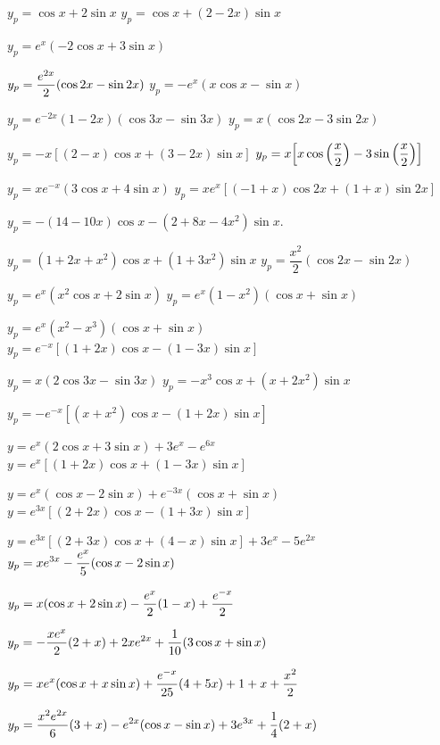 
 $y_p=\cos x+2\sin x$
 $y_p=\cos x+(2-2x)\sin x$

 $y_p=e^x(-2\cos x+3\sin x)$

 $y_p=\displaystyle{\frac{e^{2x}}{2}(\cos2x-\sin2x)}$
 $y_p=-e^x(x\cos x-\sin x)$

 $y_p=e^{-2x}(1-2x)(\cos 3x-\sin 3x)$
 $y_p=x(\cos2x-3\sin2x)$

 $y_p=-x\left[(2-x)\cos x+(3-2x)\sin x\right]$
 $y_p=x\displaystyle{\left[x\cos\left(\frac{x}{2}\right)
-3\sin\left(\frac{x}{2}\right)\right]}$

 $y_p=xe^{-x}(3\cos x+4\sin x)$
 $y_p=xe^x\left[(-1+x)\cos2x+(1+x)\sin
2x\right]$

$y_p=-(14-10x)\cos x-(2+8x-4x^2)\sin x$.

 $y_p=(1+2x+x^2)\cos x+(1+3x^2)\sin x$
 $y_p=\dfrac{x^2}{2}(\cos2x-\sin2x)$

 $y_p=e^x(x^2\cos x+2\sin x)$
 $y_p=e^x(1-x^2)(\cos x+\sin x)$

 $y_p=e^x(x^2-x^3)(\cos x+\sin x)$
 $y_p=e^{-x}\left[(1+2x)\cos x-(1-3x)\sin
x\right]$

 $y_p=x(2\cos 3x-\sin 3x)$
 $y_p=-x^3\cos x+(x+2x^2)\sin x$

$y_p=-e^{-x}\left[(x+x^2)\cos x-(1+2x)\sin x\right]$

$y=e^x(2\cos x+3\sin x)+3e^x-e^{6x}$
$y=e^x\left[(1+2x)\cos x+(1-3x)\sin x\right]$

  $y=e^x(\cos x-2\sin x)+e^{-3x}(\cos x+\sin x)$
$y=e^{3x}\left[(2+2x)\cos x-(1+3x)\sin x\right]$

$y=e^{3x}\left[(2+3x)\cos x+(4-x)\sin x\right]+3e^x-5e^{2x}$
 $y_p=\displaystyle{xe^{3x}-\frac{e^x}{5}(\cos x-2\sin
x)}$

 $y_p=\displaystyle{x(\cos x+2\sin x)-\frac{e^x}{2}(1-x)+\frac{e^{-x}}{2}}$

 $y_p=\displaystyle{-\frac{xe^x}{2}(2+x)+2xe^{2x}+\frac{1}{10}(3\cos x+\sin x)}$

 $y_p=\displaystyle{xe^x(\cos x+x\sin x)+\frac{e^{-x}}{25}(4+5x)+1+x+\frac{x^2}{2}}$

 $y_p=\displaystyle{\frac{x^2e^{2x}}{6}(3+x)-e^{2x}(\cos x-\sin
x)+3e^{3x}+\frac{1}{4}(2+x)}$

